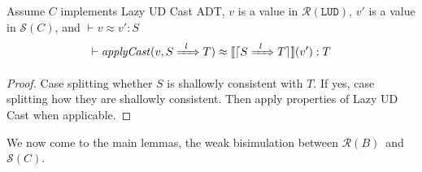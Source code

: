 \documentclass[runningheads]{llncs}
\newcommand{\RMachine}[1]{\ensuremath{\mathcal{R}(#1)}}
\newcommand{\LUDMachine}{\RMachine{\BLUD}}
\newcommand{\RBMachine}[0]{\RMachine{B}}
\newcommand{\SMachine}[1]{\ensuremath{\mathcal{S}(#1)}}
\newcommand{\ecast}[2]{\ensuremath{#1 : #2}}
\newcommand{\ccast}[3]{#1 \xRightarrow[]{\enskip #2 \enskip} #3}
\newcommand{\BLUD}[0]{\ensuremath{\mathtt{LUD}}}
\newcommand{\Kcons}[2]{[#1]#2}
\newcommand{\Fcast}[1]{\ecast{\square}{#1}}
\newcommand{\denote}[1]{\ensuremath{\llbracket #1 \rrbracket}}
\newcommand{\applyCast}[2]{\ensuremath{\mathit{applyCast}(#1,#2)}}
\newcommand{\translate}[1]{\ensuremath{\lceil#1\rceil}}
\newcommand{\mkCont}[1]{\ensuremath{\mathit{mkCont}(#1)}}
\newcommand{\extCont}[2]{\ensuremath{\mathit{extCont}(#1,#2)}}
\newcommand{\valuetyping}[2]{\ensuremath{\vdash #1 : #2}}
\newcommand{\casttyping}[3]{\ensuremath{\vdash #1 : #2 \Longrightarrow #3}}
\newcommand{\bisimv}[3]{\valuetyping{#1 \approx #2}{#3}}
\newcommand{\bisimr}[3]{\valuetyping{#1 \approx #2}{#3}}
\newcommand{\bisimc}[4]{\casttyping{#1 \approx #2}{#3}{#4}}
\newcommand{\bisimK}[4]{\casttyping{#1 \approx #2}{#3}{#4}}
\begin{document}
\begin{lemma}
	\label{lem:LazyUD-apply-cast-preserve-bisim}
	Assume $C$ implements Lazy UD Cast ADT,
	$v$ is a value in \LUDMachine,
	$v'$ is a value in \SMachine{C},
	and $\bisimv{v}{v'}{S}$
	\[
	\bisimr{
		\applyCast{v}{\ccast{S}{l}{T}}
	}{
		\denote{\translate{\ccast{S}{l}{T}}}(v')
	}{T}
	\]
\end{lemma}
\begin{proof}
	Case splitting whether $S$ is shallowly consistent with $T$.
	If yes, case splitting how they are shallowly consistent.
	Then apply properties of Lazy UD Cast when applicable.
\end{proof}
%
%

We now come to the main lemmas, the weak bisimulation between
\RBMachine\ and \SMachine{C}.
\end{document}
